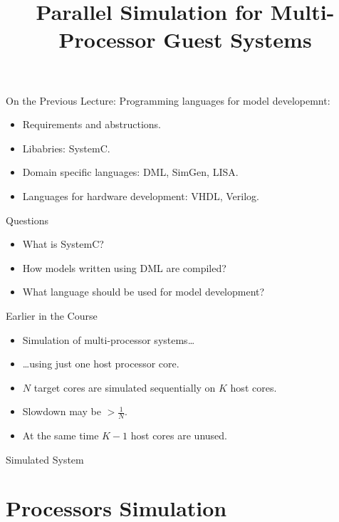 

\title{Parallel Simulation for Multi-Processor Guest Systems}



\startslides

\begin{frame}{On the Previous Lecture:}
  Programming languages for model developemnt:
  \begin{itemize}
    \item Requirements and abstructions.
    \item Libabries: SystemC.
    \item Domain specific languages: DML, SimGen, LISA.
    \item Languages for hardware development: VHDL, Verilog.
  \end{itemize}
\end{frame}

\begin{frame}{Questions}
  \begin{itemize}
    \item What is SystemC? \pause
    \item How models written using DML are compiled? \pause
    \item What language should be used for model development?
  \end{itemize}
\end{frame}

\begin{frame}{Earlier in the Course}
  \begin{itemize}
   \item Simulation of multi-processor systems\dots\pause
   \item \dots using just one host processor core.
   \vfill
   \item $N$ target cores are simulated sequentially on $K$ host cores.
   \item Slowdown may be $> \frac{1}{N}$.
   \item At the same time $K-1$ host cores are unused.
  \end{itemize}
\end{frame}

\begin{frame}{Simulated System}
  \centering
\end{frame}

\section{Processors Simulation}

